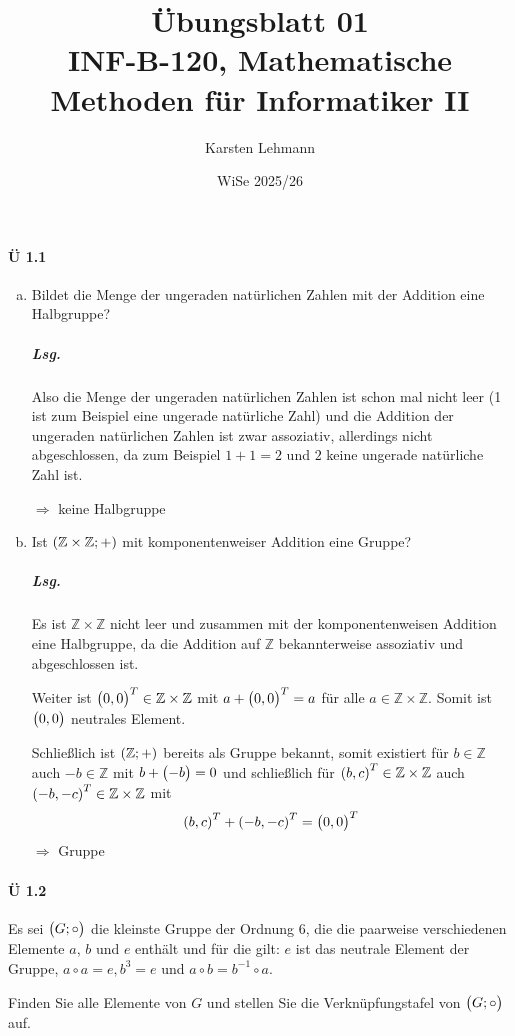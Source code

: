 \documentclass{scrreprt}
\author{Karsten Lehmann}
\date{WiSe 2025/26}
\title{Übungsblatt 01\\INF-B-120, Mathematische Methoden für Informatiker II}
\begin{document}
\paragraph{Ü 1.1}
\begin{enumerate}[(a)]
\item Bildet die Menge der ungeraden natürlichen Zahlen mit der Addition eine
  Halbgruppe?

  \subparagraph{Lsg.} Also die Menge der ungeraden natürlichen Zahlen ist schon
  mal nicht leer (1 ist zum Beispiel eine ungerade natürliche Zahl) und die
  Addition der ungeraden natürlichen Zahlen ist zwar assoziativ, allerdings nicht
  abgeschlossen, da zum Beispiel $1 + 1 = 2$ und $2$ keine ungerade natürliche
  Zahl ist.

  $\Rightarrow$ keine Halbgruppe

\item Ist $\qty(\mathbb{Z} \times \mathbb{Z}; +)$ mit komponentenweiser Addition
  eine Gruppe?

  \subparagraph{Lsg.} Es ist $\mathbb{Z} \times \mathbb{Z}$ nicht leer und
  zusammen mit der komponentenweisen Addition eine Halbgruppe, da
  die Addition auf $\mathbb{Z}$ bekannterweise assoziativ und abgeschlossen ist.

  Weiter ist $\qty\big(0, 0)^T \in \mathbb{Z} \times \mathbb{Z}$ mit
  $a + \qty\big(0, 0)^T = a$ für alle $a \in \mathbb{Z} \times \mathbb{Z}$.
  Somit ist $\qty\big(0, 0)$ neutrales Element.

  Schließlich ist $\qty(\mathbb{Z}; +)$ bereits als Gruppe bekannt, somit
  existiert für $b \in \mathbb{Z}$ auch $-b \in \mathbb{Z}$ mit
  $b + \qty\big(-b) = 0$ und schließlich für
  $\qty(b, c)^T \in \mathbb{Z} \times \mathbb{Z}$ auch
  $\qty(-b, -c)^T \in \mathbb{Z} \times \mathbb{Z}$ mit
  \[
    \qty(b, c)^T + \qty(-b, -c)^T = \qty\big(0, 0)^T
  \]
  $\Rightarrow$ Gruppe
\end{enumerate}

\paragraph{Ü 1.2} Es sei $\qty\big(G; \circ)$ die kleinste Gruppe der Ordnung
6, die die paarweise verschiedenen Elemente $a$, $b$ und $e$ enthält und für die
gilt: $e$ ist das neutrale Element der Gruppe, $a \circ a = e, b^3 = e$ und
$a \circ b = b^{-1} \circ a$.

Finden Sie alle Elemente von $G$ und stellen Sie die Verknüpfungstafel von
$\qty\big(G; \circ)$ auf.
\end{document}
